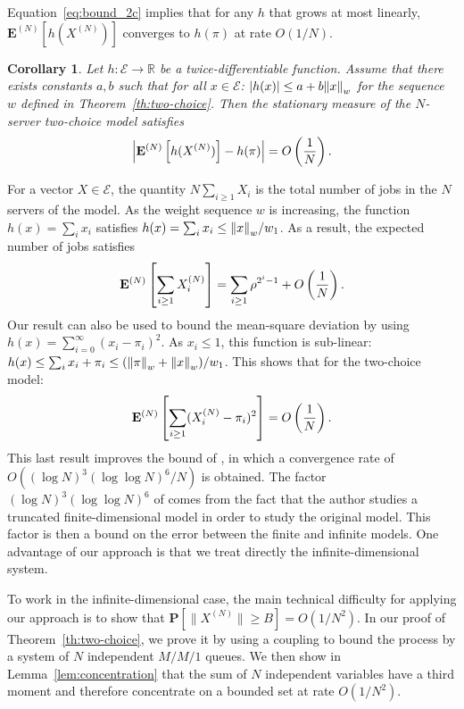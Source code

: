 \documentclass[acmlarge]{acmart}
\newcommand\XN{X^{(N)}}
\newcommand\E{\mathcal{E}}
\newcommand\R{\mathbb{R}}
\newcommand\espN[1]{{\mathchoice{\bespN{#1}}{\sespN{#1}}{\sespN{#1}}{\sespN{#1}}}}
\newcommand\bespN[1]{\mathbf{E}^{(N)}\left[#1\right]}
\newcommand\sespN[1]{\mathbf{E}^{(N)}[#1]}
\newcommand\sProba[1]{\mathbf{P}[#1]}
\newcommand\norm[1]{{\mathchoice{\bnorm{#1}}{\snorm{#1}}{\snorm{#1}}{\snorm{#1}}}}
\newcommand\bnorm[1]{\left\|#1\right\|}
\newcommand\snorm[1]{\|#1\|}
\newcommand\abs[1]{\left|#1\right|}
\newcommand\p[1]{\left(#1\right)}
\newtheorem{coro}{Corollary}
\begin{document}
Equation~\eqref{eq:bound_2c} implies that for any $h$ that grows at
most linearly, $\sespN{h(\XN)}$ converges to $h(\pi)$ at rate
$O(1/N)$.
\begin{coro}
  \label{coro:two-choice}
  Let $h:\E\to\R$ be a twice-differentiable function. Assume that
  there exists constants $a,b$ such that for all $x\in\E$:
  $|h(x)|\le a+b\norm{x}_w$ for the sequence $w$ defined in
  Theorem~\ref{th:two-choice}. Then the stationary measure of the
  $N$-server two-choice model satisfies
  \begin{align*}
    \abs{\espN{h(\XN)}-h(\pi)}=O\p{\frac1N}.
  \end{align*}
\end{coro}
For a vector $X\in\E$, the quantity
$N\sum_{i\ge 1}X_i$ is the total number of jobs in the $N$ servers of
the model. As the weight sequence $w$ is increasing, the function
$h(x)=\sum_ix_i$ satisfies $h(x)=\sum_ix_i\le \norm{x}_w/w_1$. As a
result, the expected number of jobs satisfies
\begin{align}
  \label{eq:avg_2c}
  \espN{\sum_{i\ge1}\XN_i} 
  = \sum_{i\ge1} \rho^{2^i-1} +
  O\p{\frac1N}.
\end{align}
Our result can also be used to bound the mean-square deviation by
using $h(x)=\sum_{i=0}^\infty(x_i-\pi_i)^2$. As $x_i\le1$, this
function is sub-linear:
$h(x)\le \sum_ix_i+\pi_i \le (\norm{\pi}_w + \norm{x}_w)/w_1$. This
shows that for the two-choice model:
\begin{align*}
  \espN{\sum_{i\ge1}(\XN_i-\pi_i)^2} = O\p{\frac1N}. 
\end{align*}
This last result improves the bound of \cite{ying2016twochoice}, in
which a convergence rate of $O((\log N)^3(\log\log N)^6 /N)$ is
obtained. The factor $(\log N)^3(\log\log N)^6$ of
\cite{ying2016twochoice} comes from the fact that the author studies a
truncated finite-dimensional model in order to study the original
model.  This factor is then a bound on the error between the finite
and infinite models.  One advantage of our approach is that we treat
directly the infinite-dimensional system.


To work in the infinite-dimensional case, the main technical
difficulty for applying our approach is to show that
$\sProba{\snorm{\XN}\ge B}=O(1/N^2)$. In our proof of
Theorem~\ref{th:two-choice}, we prove it by using a coupling to bound
the process by a system of $N$ independent $M/M/1$ queues. We then
show in Lemma~\ref{lem:concentration} that the sum of $N$ independent
variables have a third moment and therefore concentrate on a bounded
set at rate $O(1/N^2)$.  
\end{document}
